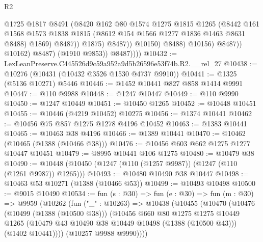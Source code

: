 \begin{lexlean}{R2}
\begin{coremodule}
                                    @1725
                                    @1817
                                    @8491
                                    (@8420
                                      @162
                                      @80
                                      @1574
                                      @1275
                                      @1815
                                      @1265
                                      (@8442
                                        @161
                                        @1568
                                        @1573
                                        @1838
                                        @1815
                                        (@8612 @154 @1566 @1277 @1836 @1463 @8631 @8488)
                                        @1869)
                                      @8487))
                                  @1875)
                                @8487))
                            @10150)
                          @8488)
                        @10156)
                      @8487))
                  @10162)
                @8487)
              (@1910 @9853))
            @8487))))
@10432 := LexLeanPreserve.C445526d9c59a952a9d5b26596e53f74b.R2.__rel_27
@10438 := @10276 (@10431 (@10432 @3526 @1530 @4737 @9910))
@10441 := @1325 (@5136 @10271) @5446
@10446 := @1452 @10441 @827 @858 @1414 @9991
@10447 := @110 @9988
@10448 := @1247 @10447
@10449 := @110 @9990
@10450 := @1247 @10449
@10451 := @10450 @1265
@10452 := @10448 @10451
@10455 := @10446 (@4219 @10452) @10275
@10456 := @1374 @10441
@10462 := @10456 @75 @857 @1275 @1278 @4196 @10452
@10463 := @1383 @10441
@10465 := @10463 @38 @4196
@10466 := @1389 @10441
@10470 := @10462 (@10465 (@1388 (@10466 @38)))
@10476 := @10456 @603 @662 @1275 @1277 @10447 @10451
@10479 := @8995 @10441 @106 @1275
@10480 := @10479 @38
@10490 := @10448 (@10450 (@1247 (@110 (@1257 @9987)) (@1247 (@110 (@1261 @9987)) @1265)))
@10493 := @10480 @10490 @38 @10447
@10498 := @10463 @53 @10271 (@1388 (@10466 @53))
@10499 := @10493 @10498
@10500 := @9015 @10490
@10534 := fun (s : @30) =>
  fun (e : @30) =>
  fun (m : @30) =>
  @9959
    (@10262
      (fun ("_" : @10263) =>
      @10438
        (@10455
          (@10470
            (@10476
              (@10499 (@1388 (@10500 @38)))
              (@10456
                @660
                @80
                @1275
                @1275
                @10449
                @1265
                (@10479 @43 @10490 @38 @10449 @10498 (@1388 (@10500 @43)))
                (@1402 @10441))))
          (@10257 @9988 @9990))))

\end{coremodule}
\end{lexlean}
